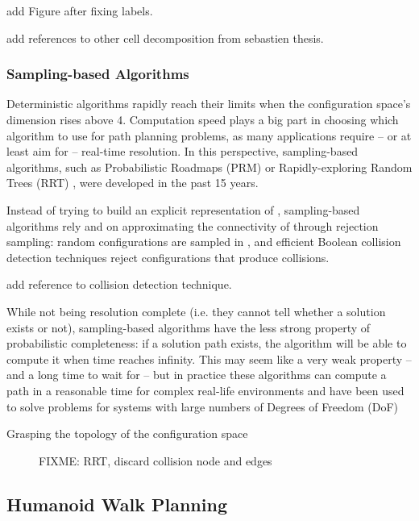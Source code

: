 add Figure after fixing labels.

add references to other cell decomposition from sebastien thesis.

\subsubsection{Sampling-based Algorithms}
\label{subsubsec:chap1-sampling-algorithms}

Deterministic algorithms rapidly reach their limits when the
configuration space's dimension rises above 4. Computation speed plays
a big part in choosing which algorithm to use for path planning
problems, as many applications require -- or at least aim for --
real-time resolution. In this perspective, sampling-based algorithms,
such as Probabilistic Roadmaps (PRM) \cite{kavr96} or
Rapidly-exploring Random Trees (RRT) \cite{kuff00}, were developed in
the past 15 years.

Instead of trying to build an explicit representation of \cfree,
sampling-based algorithms rely and on approximating the connectivity
of \cfree through rejection sampling: random configurations
 are sampled in \cspace, and efficient Boolean collision
detection techniques reject configurations that produce collisions.

add reference to collision detection technique.

While not being resolution complete (i.e. they cannot tell whether a
solution exists or not), sampling-based algorithms have the less
strong property of probabilistic completeness: if a solution path
exists, the algorithm will be able to compute it when time reaches
infinity. This may seem like a very weak property -- and a long time
to wait for -- but in practice these algorithms can compute a path in
a reasonable time for complex real-life environments and have been
used to solve problems for systems with large numbers of Degrees of
Freedom (DoF)

Grasping the topology of the configuration space

\begin{figure}
  \centering
  
  \caption{FIXME: RRT, discard collision node and edges}
  \label{fig:chap1-rrt}
\end{figure}

\subsection{Humanoid Walk Planning}
\label{subsec:chap1-humanoid-walk-planning}

